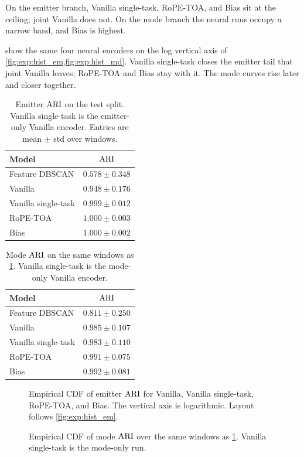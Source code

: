 On the emitter branch, Vanilla single-task, RoPE-TOA, and Bias sit at the ceiling; joint Vanilla does not.
On the mode branch the neural runs occupy a narrow band, and Bias is highest.

 show the same four neural encoders on the log vertical axis of \cref{fig:exp:hist_em,fig:exp:hist_md}.
Vanilla single-task closes the emitter tail that joint Vanilla leaves; RoPE-TOA and Bias stay with it.
The mode curves rise later and closer together.

\begin{table}[H]
  \centering
  \small
  \caption{Emitter $\mathrm{ARI}$ on the test split. Vanilla single-task is the emitter-only Vanilla encoder. Entries are mean $\pm$ std over windows.}
  \label{tab:app:ari_em}
  \begin{tabular}{@{}lc@{}}
    \toprule
    Model & $\mathrm{ARI}$ \\
    \midrule
    Feature DBSCAN & $0.578\pm0.348$ \\
    Vanilla & $0.948\pm0.176$ \\
    Vanilla single-task & $0.999\pm0.012$ \\
    RoPE-TOA & $\mathbf{1.000\pm0.003}$ \\
    Bias & $\mathbf{1.000\pm0.002}$ \\
    \bottomrule
  \end{tabular}
\end{table}

\begin{table}[H]
  \centering
  \small
  \caption{Mode $\mathrm{ARI}$ on the same windows as \cref{tab:app:ari_em}. Vanilla single-task is the mode-only Vanilla encoder.}
  \label{tab:app:ari_md}
  \begin{tabular}{@{}lc@{}}
    \toprule
    Model & $\mathrm{ARI}$ \\
    \midrule
    Feature DBSCAN & $0.811\pm0.250$ \\
    Vanilla & $0.985\pm0.107$ \\
    Vanilla single-task & $0.983\pm0.110$ \\
    RoPE-TOA & $0.991\pm0.075$ \\
    Bias & $\mathbf{0.992\pm0.081}$ \\
    \bottomrule
  \end{tabular}
\end{table}

\begin{figure}[H]
  \centering
  \caption{Empirical CDF of emitter $\mathrm{ARI}$ for Vanilla, Vanilla single-task, RoPE-TOA, and Bias. The vertical axis is logarithmic. Layout follows \cref{fig:exp:hist_em}.}
  \label{fig:app:hist_em_all}
\end{figure}

\begin{figure}[H]
  \centering
  \caption{Empirical CDF of mode $\mathrm{ARI}$ over the same windows as \cref{fig:app:hist_em_all}. Vanilla single-task is the mode-only run.}
  \label{fig:app:hist_md_all}
\end{figure}
